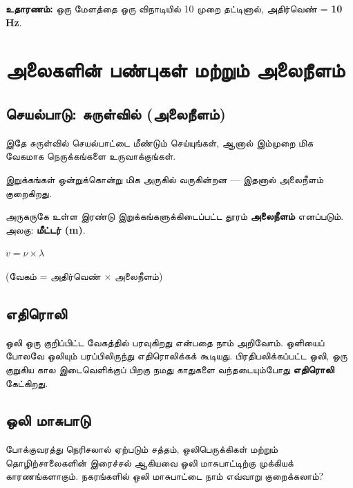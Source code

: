 \documentclass[12pt,a4paper]{tufte-handout}
\begin{document}
\noindent\textbf{உதாரணம்:} ஒரு மேளத்தை ஒரு விநாடியில் 10 முறை தட்டினால்,
அதிர்வெண் = \textbf{10 Hz}.

\section{அலைகளின் பண்புகள் மற்றும் அலைநீளம்}

\subsection*{செயல்பாடு: சுருள்வில் (அலைநீளம்)}

இதே சுருள்வில் செயல்பாட்டை மீண்டும் செய்யுங்கள், ஆனால் இம்முறை மிக வேகமாக
நெருக்கங்களை உருவாக்குங்கள்.

\begin{tcolorbox}[observebox]
இறுக்கங்கள் ஒன்றுக்கொன்று மிக அருகில் வருகின்றன --- இதனால் அலைநீளம் குறைகிறது.
\end{tcolorbox}

\begin{tcolorbox}[conceptbox]
அருகருகே உள்ள இரண்டு இறுக்கங்களுக்கிடைப்பட்ட தூரம் \textbf{அலைநீளம்} எனப்படும்.
அலகு: \textbf{மீட்டர் (m)}.

\begin{center}
\Large $v = \nu \times \lambda$
\end{center}
\begin{center}
\small (வேகம் = அதிர்வெண் $\times$ அலைநீளம்)
\end{center}
\end{tcolorbox}

\subsection{எதிரொலி}

ஒலி ஒரு குறிப்பிட்ட வேகத்தில் பரவுகிறது என்பதை நாம் அறிவோம். ஒளியைப் போலவே ஒலியும்
பரப்பிலிருந்து எதிரொலிக்கக் கூடியது. பிரதிபலிக்கப்பட்ட ஒலி, ஒரு குறுகிய கால
இடைவெளிக்குப் பிறகு நமது காதுகளை வந்தடையும்போது \textbf{எதிரொலி} கேட்கிறது.

\subsection{ஒலி மாசுபாடு}

போக்குவரத்து நெரிசலால் ஏற்படும் சத்தம், ஒலிபெருக்கிகள் மற்றும் தொழிற்சாலைகளின்
இரைச்சல் ஆகியவை ஒலி மாசுபாட்டிற்கு முக்கியக் காரணங்களாகும். நகரங்களில் ஒலி
மாசுபாட்டை நாம் எவ்வாறு குறைக்கலாம்?
\end{document}
